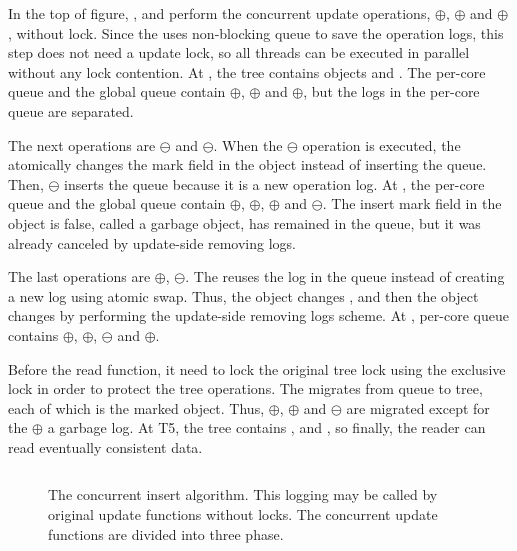 In the top of figure, ,  and  perform the
concurrent update operations, $\oplus$, $\oplus$ and
$\oplus$, without lock.
Since the \LDU uses non-blocking queue to save the operation logs, this step does not need
a update lock, so all threads can be executed in parallel without any lock contention.
At , the tree contains objects  and . 
The per-core queue and the global queue contain $\oplus$, $\oplus$ and
$\oplus$, but the logs in the per-core queue are separated.

The next operations are $\ominus$ and $\ominus$.
When the $\ominus$ operation is executed, the \LDU atomically changes 
the mark field in the object instead of inserting the queue.
Then, $\ominus$ inserts the queue because it is a new operation log.
At , the per-core queue and the global queue contain 
$\oplus$, $\oplus$, $\oplus$ and
$\ominus$.
The insert mark field in the object  is false, called a garbage object, 
has remained in the queue, but it was already canceled 
by update-side removing logs.

The last operations are $\oplus$, $\ominus$.
The \LDU reuses the log in the queue instead of 
creating a new log using atomic swap.
Thus, the object  changes , and then the object  
changes  by performing the update-side removing logs scheme.
At , per-core queue contains
$\oplus$, $\oplus$, $\ominus$ 
and $\oplus$.

Before the read function, it need to lock the original tree lock using the
exclusive lock in order to protect the tree operations.
The \LDU migrates from queue to tree, each of which is the marked object.
Thus, $\oplus$, $\oplus$ and $\ominus$ are
migrated except for the $\oplus$ a garbage log.
At T5, the tree contains ,  and
, so finally, the reader can read eventually consistent data.


\begin{figure}[h]
\begin{center}
\inputminted[linenos,fontsize=\footnotesize, tabsize=2]{c}{src/ldu_logical_a.c}
\end{center}
\caption{The \LDU concurrent insert algorithm.  This logging may be called by
original update functions without locks. The concurrent update functions are
divided into three phase.}
\label{fig:gldulogicalupdate}
\end{figure}


